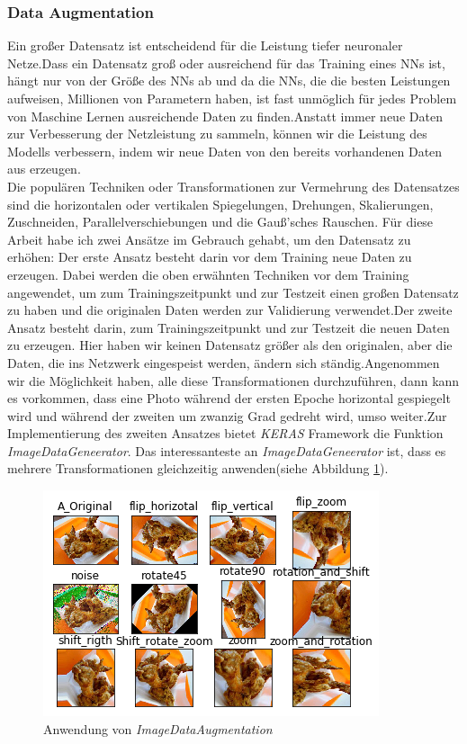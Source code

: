 \documentclass[12pt,a4paper]{scrartcl}
\numberwithin{equation}{section}
\begin{document}
 \subsubsection{{Data Augmentation}}\label{Data Augmentation}
 Ein großer Datensatz ist entscheidend für die Leistung tiefer neuronaler Netze.Dass ein Datensatz groß oder ausreichend für das Training eines \ac{NN}s ist, hängt nur von der Größe des \ac{NN}s ab und da die \acsp{NN}, die die besten Leistungen aufweisen, Millionen von Parametern haben, ist fast unmöglich für jedes  Problem von Maschine Lernen ausreichende Daten zu finden.Anstatt immer neue Daten zur Verbesserung der Netzleistung zu sammeln, können wir die Leistung des Modells verbessern, indem wir neue Daten von den bereits vorhandenen Daten aus erzeugen.\\
 Die populären Techniken oder Transformationen zur Vermehrung des Datensatzes sind die horizontalen oder vertikalen Spiegelungen, Drehungen, Skalierungen, Zuschneiden, Parallelverschiebungen und die Gauß'sches Rauschen.
 Für diese Arbeit habe ich zwei Ansätze im Gebrauch gehabt, um den Datensatz zu erhöhen:
 Der erste Ansatz besteht darin vor dem Training neue Daten zu erzeugen. Dabei werden die oben erwähnten Techniken vor dem Training angewendet, um zum Trainingszeitpunkt und zur Testzeit einen großen Datensatz zu haben und die originalen Daten werden zur Validierung verwendet.Der zweite Ansatz besteht darin, zum Trainingszeitpunkt und zur Testzeit die neuen Daten zu erzeugen. Hier haben wir keinen Datensatz größer als den originalen, aber die Daten, die ins Netzwerk eingespeist werden, ändern sich ständig.Angenommen wir die Möglichkeit haben, alle diese Transformationen durchzuführen, dann kann es vorkommen, dass eine Photo während der ersten Epoche horizontal gespiegelt wird und während der zweiten um  zwanzig Grad gedreht wird, umso weiter.Zur Implementierung des zweiten Ansatzes bietet \textit{KERAS} Framework die Funktion \textit{ImageDataGeneerator}. Das interessanteste an \textit{ImageDataGeneerator} ist, dass es mehrere Transformationen gleichzeitig anwenden(siehe Abbildung \ref{fig:ImageDataAugmentation}).

 \begin{figure}[h]
 	\centering
 	\includegraphics{ImageDataAugmaentation.png}
 	\caption{Anwendung von \textit{ImageDataAugmentation} }
 	\label{fig:ImageDataAugmentation}
 \end{figure}
 
\end{document}
